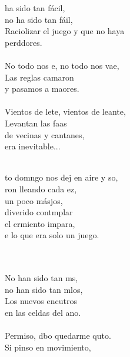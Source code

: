 \begin{cancion}%
	ha sido tan fácil, \\
	no ha sido tan fáil,\\
	Raciolizar el juego y que no haya \\
	perddores.\\
\jump\\
	No todo nos e, no todo nos vae,\\
	Las reglas camaron \\
	y pasamos a maores.\\
\jump\\
	Vientos de lete, vientos de leante,\\
	Levantan las faas \\
	de vecinas y cantanes,\\
era inevitable...\\\jump\\
	\begin{chorus}%
	to domngo nos dej en aire y so, \\
	ron lleando cada ez, \\
	un poco másjos,\\
	 diverido contmplar  \\
	el crmiento impara,\\
	e lo que era solo un juego.\\
	\end{chorus}%
	\jump\\
	   \\
	No han sido tan ms, \\
	no han sido tan mlos,\\
	Los nuevos encutros  \\
	en las celdas del ano.\\
\jump\\
	Permiso, dbo quedarme quto.\\
	Si pinso en movimiento,\\

\end{cancion}
